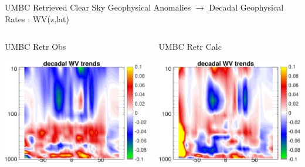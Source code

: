 \documentclass[10pt,t]{beamer}
\begin{document}
\begin{frame}{UMBC Retrieved Clear Sky Geophysical Anomalies $\rightarrow$ Decadal Geophysical Rates : WV(z,lat)}
\begin{columns}
\begin{column}{0.45\columnwidth}
\begin{block}{\footnotesize UMBC Retr Obs}
\vspace{-0.1in}
\begin{center}
\includegraphics[width=\linewidth]{Figs/ClearAnom/umbc_clr_retr_obs_ptemp_rate_200209_201808.png}
\end{center}
\end{block}
\end{column}

\begin{column}{0.45\columnwidth}
\begin{block}{\footnotesize UMBC Retr Calc}
\vspace{-0.1in}
\begin{center}
\includegraphics[width=\linewidth]{Figs/ClearAnom/umbc_clr_retr_cal_ptemp_rate_200209_201808.png}
\end{center}
\end{block}
\end{column}
\end{columns}


\end{frame}
\end{document}
